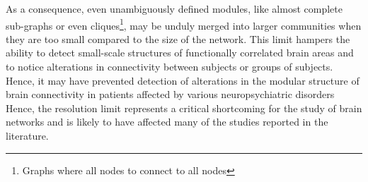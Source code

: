 As a consequence, even unambiguously defined modules, like almost complete sub-graphs or even cliques\footnote{Graphs where all nodes to connect to all nodes}, may be unduly merged into larger communities when they are too small compared to the size of the network.
This limit hampers the ability to detect small-scale structures of functionally correlated brain areas and to notice alterations in connectivity between subjects or groups of subjects. Hence, it may have prevented detection of alterations in the modular structure of brain connectivity in patients affected by various neuropsychiatric disorders
Hence, the resolution limit represents a critical shortcoming for the study of brain networks and is likely to have affected many of the studies reported in the literature.

